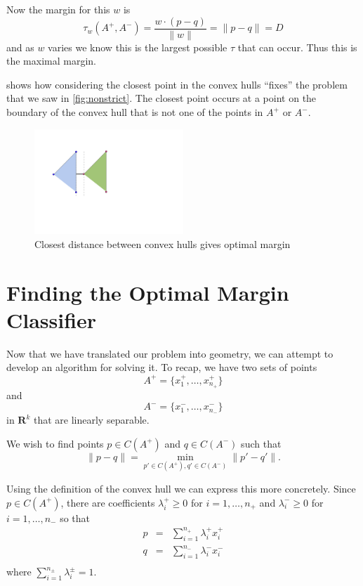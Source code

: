 \documentclass[
  oneside]{scrbook}
\begin{document}
Now the margin for this \(w\) is \[
\tau_{w}(A^{+},A^{-}) = \frac{w\cdot (p-q)}{\|w\|} = \|p-q\|=D
\] and as \(w\) varies we know this is the largest possible \(\tau\)
that can occur. Thus this is the maximal margin.

 shows how considering the closest point in the convex
hulls ``fixes'' the problem that we saw in \cref{fig:nonstrict}. The
closest point occurs at a point on the boundary of the convex hull that
is not one of the points in \(A^{+}\) or \(A^{-}\).

\begin{figure}
\hypertarget{fig:strict}{%
\centering
\includegraphics[width=0.5\textwidth,height=\textheight]{img/ConvexHullWithMargin.png}
\caption{Closest distance between convex hulls gives optimal
margin}\label{fig:strict}
}
\end{figure}

\hypertarget{finding-the-optimal-margin-classifier}{%
\section{Finding the Optimal Margin
Classifier}\label{finding-the-optimal-margin-classifier}}

Now that we have translated our problem into geometry, we can attempt to
develop an algorithm for solving it. To recap, we have two sets of
points \[
A^{+}=\{x^+_1,\ldots, x^+_{n_{+}}\}
\] and \[
A^{-}=\{x^-_1,\ldots, x^-_{n_{-}}\}
\] in \(\mathbf{R}^{k}\) that are linearly separable.

We wish to find points \(p\in C(A^{+})\) and \(q\in C(A^{-})\) such that
\[
\|p-q\|=\min_{p'\in C(A^{+}),q'\in C(A^{-})} \|p'-q'\|.
\]

Using the definition of the convex hull we can express this more
concretely. Since \(p\in C(A^{+})\), there are coefficients
\(\lambda^{+}_{i}\ge 0\) for \(i=1,\ldots,n_{+}\) and
\(\lambda^{-}_{i}\ge 0\) for \(i=1,\ldots, n_{-}\) so that \[
\begin{aligned}
p&=&\sum_{i=1}^{n_{+}}\lambda^{+}_{i} x^{+}_{i} \\
q&=&\sum_{i=1}^{n_{-}}\lambda^{-}_{i} x^{-}_{i} \\
\end{aligned}
\] where \(\sum_{i=1}^{n_{\pm}} \lambda_{i}^{\pm}=1\).
\end{document}
